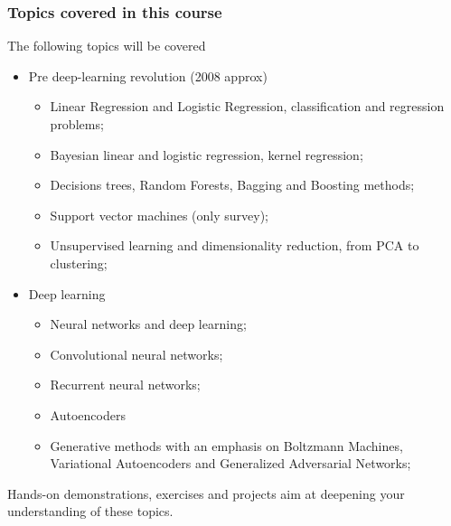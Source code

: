 \documentclass{beamer}
\begin{document}
\begin{frame}
\frametitle{Topics covered in this course}

\begin{block}{}
The following topics will be covered

\begin{itemize}
\item Pre deep-learning revolution (2008 approx)
\begin{itemize}

  \item Linear Regression and Logistic Regression, classification and regression problems;

  \item Bayesian linear and logistic regression, kernel regression;

  \item Decisions trees, Random Forests, Bagging and Boosting methods;

  \item Support vector machines (only survey);

  \item Unsupervised learning and  dimensionality reduction, from PCA to clustering;  

\end{itemize}

\noindent
\item Deep learning  
\begin{itemize}

  \item Neural networks and deep learning;

  \item Convolutional neural networks;

  \item Recurrent neural networks;

  \item Autoencoders

  \item Generative methods with an emphasis on Boltzmann Machines, Variational Autoencoders and Generalized Adversarial Networks;
\end{itemize}

\noindent
\end{itemize}

\noindent
Hands-on demonstrations, exercises and projects aim at deepening your understanding of these topics.

\end{block}
\end{frame}
\end{document}
